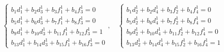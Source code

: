 \begin{equation*}
    \begin{cases}
        b_1 d_1^1 + b_2 d_3^1 + b_3 f_1^1 + b_4 f_3^1 = 0 \\
        b_5 d_1^1 + b_6 d_3^1 + b_7 f_1^1 + b_8 f_3^1 = 0 \\
        b_9 d_1^1 + b_{10} d_3^1 + b_{11} f_1^1 + b_{12} f_3^1 = 1 \\
        b_{13} d_1^1 + b_{14} d_3^1 + b_{15} f_1^1 + b_{16} f_3^1 = 0
    \end{cases}, \quad
    \begin{cases}
        b_1 d_2^1 + b_2 d_4^1 + b_3 f_2^1 + b_4 f_4^1 = 0 \\
        b_5 d_2^1 + b_6 d_4^1 + b_7 f_2^1 + b_8 f_4^1 = 0 \\
        b_9 d_2^1 + b_{10} d_4^1 + b_{11} f_2^1 + b_{12} f_4^1 = 0 \\
        b_{13} d_2^1 + b_{14} d_4^1 + b_{15} f_2^1 + b_{16} f_4^1 = 1
    \end{cases}
\end{equation*}
